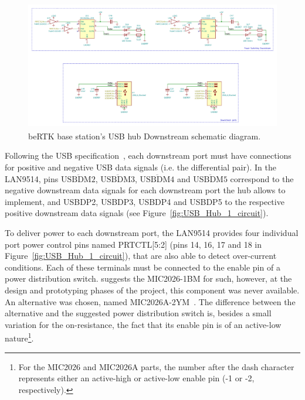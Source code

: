 \begin{figure}[h]
	\centering
	\includegraphics[width=1.0\textwidth]{Chapters/Figures/chapter3/USB_Hub_Downstream.pdf}
	\caption{beRTK\textsuperscript{\textregistered} base station's USB hub Downstream schematic diagram.}
	\label{fig:USB_Hub_Downstream_circuit}
\end{figure}

Following the USB specification~\cite{USB_Specification}, each downstream port must have connections for positive and negative USB data signals (i.e. the differential pair). In the LAN9514, pins $\overline{\mbox{USBDM2}}$, $\overline{\mbox{USBDM3}}$, $\overline{\mbox{USBDM4}}$ and $\overline{\mbox{USBDM5}}$ correspond to the negative downstream data signals for each downstream port the hub allows to implement, and USBDP2, USBDP3, USBDP4 and USBDP5 to the respective positive downstream data signals (see Figure~\ref{fig:USB_Hub_1_circuit}).

To deliver power to each downstream port, the LAN9514 provides four individual port power control pins named PRTCTL[5:2] (pins 14, 16, 17 and 18 in Figure~\ref{fig:USB_Hub_1_circuit}), that are also able to detect over-current conditions. Each of these terminals must be connected to the enable pin of a power distribution switch.
\cite{LAN9514_ref_schematic} suggests the MIC2026-1BM for such, however, at the design and prototyping phases of the project, this component was never available. An alternative was chosen, named MIC2026A-2YM~\cite{MIC2026A}. The difference between the alternative and the suggested power distribution switch is, besides a small variation for the on-resistance, the fact that its enable pin is of an active-low nature\footnote[17]{For the MIC2026 and MIC2026A parts, the number after the dash character represents either an active-high or active-low enable pin (-1 or -2, respectively).}.

